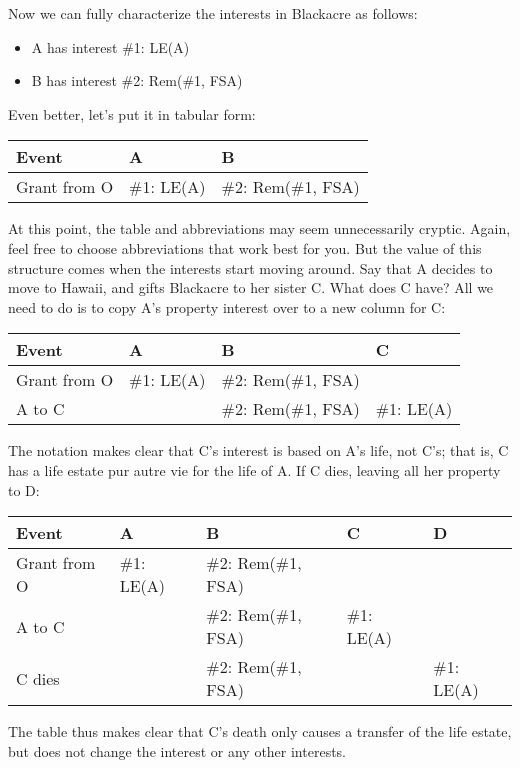 Now we can fully characterize the interests in Blackacre as follows:
\begin{itemize}
\item A has interest \#1: LE(A)
\item B has interest \#2: Rem(\#1, FSA)
\end{itemize}
Even better, let's put it in tabular form:
\begin{center}
\begin{tabular}{l|ll}
Event & A & B \\
\hline
Grant from O & \#1: LE(A) & \#2: Rem(\#1, FSA) \\
\end{tabular}
\end{center}

At this point, the table and abbreviations may seem unnecessarily cryptic.
Again, feel free to choose abbreviations that work best for you. But the value
of this structure comes when the interests start moving around. Say that A
decides to move to Hawaii, and gifts Blackacre to her sister C. What does C
have? All we need to do is to copy A's property interest over to a new column
for C:
\begin{center}
\begin{tabular}{l|lll}
Event & A & B & C \\
\hline
Grant from O & \#1: LE(A) & \#2: Rem(\#1, FSA) & \\
A to C & & \#2: Rem(\#1, FSA) & \#1: LE(A) \\
\end{tabular}
\end{center}
The notation makes clear that C's interest is based on A's life, not C's; that
is, C has a life estate pur autre vie for the life of A. If C dies, leaving all
her property to D:
\begin{center}
\begin{tabular}{l|llll}
Event & A & B & C & D \\
\hline
Grant from O & \#1: LE(A) & \#2: Rem(\#1, FSA) & &\\
A to C & & \#2: Rem(\#1, FSA) & \#1: LE(A) & \\
C dies & & \#2: Rem(\#1, FSA) & & \#1: LE(A) \\
\end{tabular}
\end{center}
The table thus makes clear that C's death only causes a transfer of the life
estate, but does not change the interest or any other interests.

